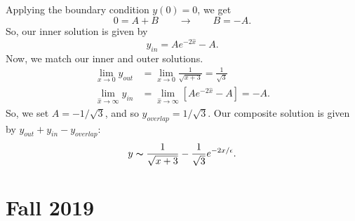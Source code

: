 \documentclass[10pt,letterpaper]{report}
\newcommand{\so}{\qquad \rightarrow \qquad}
\renewcommand{\chaptermark}[1]{%
\markboth{#1}{}}
\begin{document}
\begin{enumerate}
Applying the boundary condition $y(0) = 0$, we get
\[
0 = A + B \so B = -A.
\]
So, our inner solution is given by
\[
y_{in} = A e^{-2 \hat x} - A.
\]
Now, we match our inner and outer solutions.
\begin{align*}
    \lim_{x \to 0} y_{out} &= \lim_{x\to 0} \frac{1}{\sqrt{x + 3}} = \frac{1}{\sqrt 3} \\
    \lim_{\hat x \to \infty} y_{in} &= \lim_{\hat x \to \infty} \left[A e^{-2 \hat x} - A\right] = -A.
\end{align*}
So, we set $A = -1/\sqrt 3$, and so $y_{overlap} = 1/\sqrt 3$. Our composite solution is given by $y_{out} + y_{in} - y_{overlap}:$
\[
y \thicksim \frac{1}{\sqrt{x + 3}} - \frac{1}{\sqrt 3} e^{-2 x / \epsilon}.
\]
\end{enumerate}

\chapter*{Fall 2019}
\chaptermark{Fall 2019}
\end{document}

